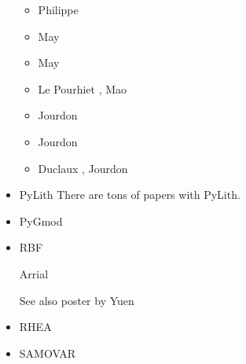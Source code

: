 \begin{itemize}
\begin{scriptsize}
\begin{itemize}
\item[\twothousandthirteen] Philippe \cite{phil13}
\item[\twothousandfourteen] May \etal \cite{mabl14}
\item[\twothousandfifteen] May \etal \cite{mabl15}
\item[\twothousandseventeen] Le Pourhiet \etal \cite{lemh17}, Mao \etal \cite{magm17}
\item[\twothousandeighteen] Jourdon \etal \cite{jolp18}
\item[\twothousandnineteen] Jourdon \etal \cite{jolm19}
\item[\twothousandtwenty] Duclaux \etal \cite{duhm20}, Jourdon \etal \cite{jolm20}
\end{itemize}
\end{scriptsize}

\item PyLith 
There are tons of papers with PyLith. 

{\small
\noindent
\cite{aakw13}
}

\item PyGmod 

{\small
\noindent
\cite{crvs15}
}

\item {\codefont RBF} 

Arrial \etal \cite{arfw14}

See also poster by Yuen


\item RHEA 

{\small
\noindent
\cite{bugg08}
\cite{stgb10}
\cite{algs12}
\cite{busa13}
}

\item SAMOVAR


\end{itemize}
